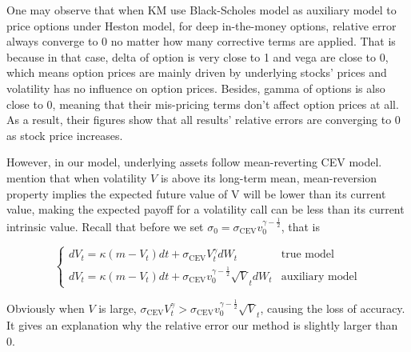 One may observe that when KM use Black-Scholes model as auxiliary model to price options under Heston model, for deep in-the-money options, relative error always converge to 0 no matter how many corrective terms are applied. That is because in that case, delta of option is very close to 1 and vega are close to 0, which means option prices are mainly driven by underlying stocks' prices and volatility has no influence on option prices. Besides, gamma of options is also close to 0, meaning that their mis-pricing terms don't affect option prices at all. As a result, their figures show that all results' relative errors are converging to 0 as stock price increases.

However, in our model, underlying assets follow mean-reverting CEV model. \cite{grunbichler_valuing_1996} mention that when volatility $V$ is above its long-term mean, mean-reversion property implies the expected future value of V will be lower than its current value, making the expected payoff for a volatility call can be less than its current intrinsic value. Recall that before we set $\sigma_0 = \sigma_{\text{CEV}}v_0^{\gamma-\frac{1}{2}}$, that is 

$$
\begin{cases}
  d V_t=\kappa(m - V_t) d t+\sigma_{\text{CEV}} V^{\gamma}_t d W_t &\text{true model}\\
  d V_t=\kappa(m - V_t) d t+\sigma_{\text{CEV}}v_0^{\gamma-\frac{1}{2}} \sqrt{V}_t d W_t &\text{auxiliary model}
\end{cases}
$$

\noindent Obviously when $V$ is large, $\sigma_{\text{CEV}} V^{\gamma}_t > \sigma_{\text{CEV}}v_0^{\gamma-\frac{1}{2}} \sqrt{V}_t$, causing the loss of accuracy. It gives an explanation why the relative error our method is slightly larger than 0.